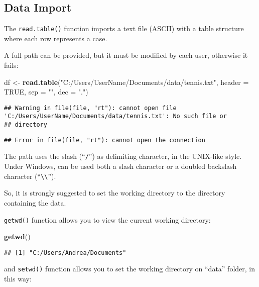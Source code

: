 \documentclass[]{book}
\newenvironment{Shaded}{\begin{snugshade}}{\end{snugshade}}
\newcommand{\KeywordTok}[1]{\textcolor[rgb]{0.13,0.29,0.53}{\textbf{{#1}}}}
\newcommand{\DataTypeTok}[1]{\textcolor[rgb]{0.13,0.29,0.53}{{#1}}}
\newcommand{\StringTok}[1]{\textcolor[rgb]{0.31,0.60,0.02}{{#1}}}
\newcommand{\OtherTok}[1]{\textcolor[rgb]{0.56,0.35,0.01}{{#1}}}
\newcommand{\NormalTok}[1]{{#1}}
\begin{document}
\subsection{Data Import}\label{data-import}

The \texttt{read.table()} function imports a text file (ASCII) with a
table structure where each row represents a case.

A full path can be provided, but it must be modified by each user,
otherwise it fails:

\begin{Shaded}
\begin{Highlighting}[]
\NormalTok{df <-}\StringTok{ }\KeywordTok{read.table}\NormalTok{(}\StringTok{"C:/Users/UserName/Documents/data/tennis.txt"}\NormalTok{, }\DataTypeTok{header =} \OtherTok{TRUE}\NormalTok{, }\DataTypeTok{sep =} \StringTok{""}\NormalTok{, }\DataTypeTok{dec =} \StringTok{"."}\NormalTok{)}
\end{Highlighting}
\end{Shaded}

\begin{verbatim}
## Warning in file(file, "rt"): cannot open file 'C:/Users/UserName/Documents/data/tennis.txt': No such file or
## directory
\end{verbatim}

\begin{verbatim}
## Error in file(file, "rt"): cannot open the connection
\end{verbatim}

The path uses the slash (``\texttt{/}'') as delimiting character, in the
UNIX-like style. Under Windows, can be used both a slash character or a
doubled backslash character
(``\texttt{\textbackslash{}\textbackslash{}}'').

So, it is strongly suggested to set the working directory to the
directory containing the data.

\texttt{getwd()} function allows you to view the current working
directory:

\begin{Shaded}
\begin{Highlighting}[]
\KeywordTok{getwd}\NormalTok{() }
\end{Highlighting}
\end{Shaded}

\begin{verbatim}
## [1] "C:/Users/Andrea/Documents"
\end{verbatim}

and \texttt{setwd()} function allows you to set the working directory on
``data'' folder, in this way:
\end{document}
